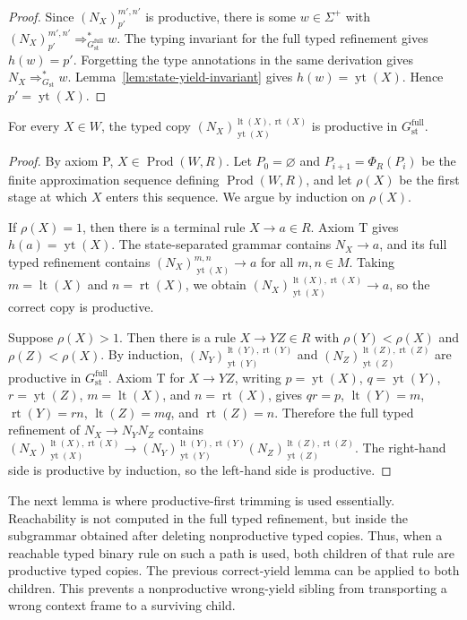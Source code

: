 \documentclass[sub]{jalc}
\newcommand{\yt}{\operatorname{yt}}
\newcommand{\lt}{\operatorname{lt}}
\newcommand{\rt}{\operatorname{rt}}
\newcommand{\Prod}{\operatorname{Prod}}
\begin{document}
\begin{proof}
Since \((N_X)_{p'}^{m',n'}\) is productive, there is some \(w\in\Sigma^+\) with \((N_X)_{p'}^{m',n'}\Rightarrow_{G_{\mathrm{st}}^{\mathrm{full}}}^* w\). The typing invariant for the full typed refinement gives \(h(w)=p'\). Forgetting the type annotations in the same derivation gives \(N_X\Rightarrow_{G_{\mathrm{st}}}^* w\). Lemma~\ref{lem:state-yield-invariant} gives \(h(w)=\yt(X)\). Hence \(p'=\yt(X)\).
\end{proof}

\begin{lemma}
\label{lem:correct-copy-productive}
For every \(X\in W\), the typed copy \((N_X)_{\yt(X)}^{\lt(X),\rt(X)}\) is productive in \(G_{\mathrm{st}}^{\mathrm{full}}\).
\end{lemma}

\begin{proof}
By axiom P, \(X\in\Prod(W,R)\). Let \(P_0=\varnothing\) and \(P_{i+1}=\Phi_R(P_i)\) be the finite approximation sequence defining \(\Prod(W,R)\), and let \(\rho(X)\) be the first stage at which \(X\) enters this sequence. We argue by induction on \(\rho(X)\).

If \(\rho(X)=1\), then there is a terminal rule \(X\to a\in R\). Axiom T gives \(h(a)=\yt(X)\). The state-separated grammar contains \(N_X\to a\), and its full typed refinement contains \((N_X)_{\yt(X)}^{m,n}\to a\) for all \(m,n\in M\). Taking \(m=\lt(X)\) and \(n=\rt(X)\), we obtain \((N_X)_{\yt(X)}^{\lt(X),\rt(X)}\to a\), so the correct copy is productive.

Suppose \(\rho(X)>1\). Then there is a rule \(X\to YZ\in R\) with \(\rho(Y)<\rho(X)\) and \(\rho(Z)<\rho(X)\). By induction, \((N_Y)_{\yt(Y)}^{\lt(Y),\rt(Y)}\) and \((N_Z)_{\yt(Z)}^{\lt(Z),\rt(Z)}\) are productive in \(G_{\mathrm{st}}^{\mathrm{full}}\). Axiom T for \(X\to YZ\), writing \(p=\yt(X)\), \(q=\yt(Y)\), \(r=\yt(Z)\), \(m=\lt(X)\), and \(n=\rt(X)\), gives \(qr=p\), \(\lt(Y)=m\), \(\rt(Y)=rn\), \(\lt(Z)=mq\), and \(\rt(Z)=n\). Therefore the full typed refinement of \(N_X\to N_YN_Z\) contains \((N_X)_{\yt(X)}^{\lt(X),\rt(X)}\to (N_Y)_{\yt(Y)}^{\lt(Y),\rt(Y)}(N_Z)_{\yt(Z)}^{\lt(Z),\rt(Z)}\). The right-hand side is productive by induction, so the left-hand side is productive.
\end{proof}

The next lemma is where productive-first trimming is used essentially. Reachability is not computed in the full typed refinement, but inside the subgrammar obtained after deleting nonproductive typed copies. Thus, when a reachable typed binary rule on such a path is used, both children of that rule are productive typed copies. The previous correct-yield lemma can be applied to both children. This prevents a nonproductive wrong-yield sibling from transporting a wrong context frame to a surviving child.
\end{document}
